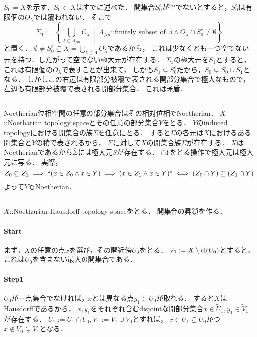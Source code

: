 \documentclass[a4paper]{jarticle}
\begin{document}
    $S_0=X$を示す．$S_0 \subset X$はすでに述べた．
    開集合$S_0^c$が空でないとすると，$S_0^c$は有限個の$O_{\lambda}$では覆われない．
    そこで
    \[
        \Sigma_1:=
    \left\{ \bigcup_{\lambda \in \Lambda_{fin}}O_{\lambda}
            ~\middle|~
            \Lambda_{fin} \mbox{::finitely subset of }\Lambda \land O_{\lambda} \cap S_0^c \neq \emptyset \right\} \]
    と置く．
    $\emptyset \neq S_0^c \subsetneq X=\bigcup_{\lambda \in \Lambda}O_{\lambda}$であるから，
    これは少なくとも一つ空でない元を持つ．したがって空でない極大元が存在する．
    $\Sigma_1$の極大元を$S_1$とすると，これは有限個の$O_{\lambda}$で表すことが出来て，
    しかも$S_1 \subsetneq S_0^c$だから，$S_0 \subsetneq S_0 \cup S_1$となる．
    しかしこの右辺は有限部分被覆で表される開部分集合で極大なもので，左辺も有限部分被覆で表される開部分集合．
    これは矛盾．

\subsection{}
    Noetherian位相空間の任意の部分集合はその相対位相でNoetherian．
    $X$::Noetharian topology spaceとその任意の部分集合$Y$をとる．
    $Y$のinduced topologyにおける開集合の族$\Sigma$を任意にとる．
    すると$\Sigma$の各元は$X$におけるある開集合と$Y$の積で表されるから，
    $\Sigma$に対して$X$の開集合族$\bar{\Sigma}$が存在する．
    $X$はNoetherianであるから$\bar{\Sigma}$には極大元$S$が存在する．
    $\cap Y$をとる操作で極大元は極大元に写る．
    実際，
    \[ Z_0 \subseteq Z_1 \implies ``(x \in Z_0 \land x \in Y) \implies (x \in Z_1 \land x \in Y)" \iff (Z_0 \cap Y) \subseteq (Z_1 \cap Y) \]
    よって$Y$もNoetherian．

\subsection{}
    $X$::Noetharian Hausdorff topology spaceをとる．
    開集合の昇鎖を作る．

    \paragraph{Start}
    まず，$X$の任意の点$x$を選び，その開近傍$U_0$をとる．
    $V_0:=X \setminus \operatorname{cl}(U_0)$とすると，これは$U_0$を含まない最大の開集合である．

    \paragraph{Step1}
    $U_0$が一点集合でなければ，$x$とは異なる点$y_1 \in U_0$が取れる．
    すると$X$はHausdorffであるから，
    $x, y_1$をそれぞれ含むdisjointな開部分集合$x \in \tilde{U}_1, y_1 \in \tilde{V}_1$が存在する．
    $U_1:=\tilde{U}_1 \cap U_0, V_1:=\tilde{V}_1 \cup V_0$とすれば，
    $x \in U_1 \subsetneq U_0$かつ$x \not \in V_0 \subsetneq V_1$となる．
\end{document}

